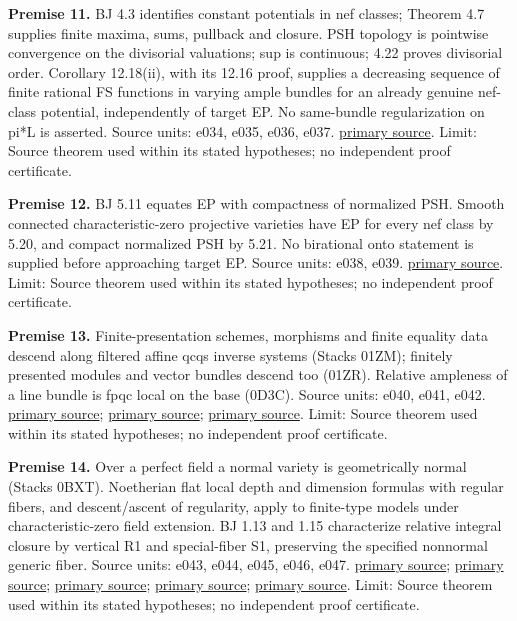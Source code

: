 \documentclass[
  10pt,
]{article}
\begin{document}
\textbf{Premise 11.} BJ 4.3 identifies constant potentials in nef
classes; Theorem 4.7 supplies finite maxima, sums, pullback and closure.
PSH topology is pointwise convergence on the divisorial valuations; sup
is continuous; 4.22 proves divisorial order. Corollary 12.18(ii), with
its 12.16 proof, supplies a decreasing sequence of finite rational FS
functions in varying ample bundles for an already genuine nef-class
potential, independently of target EP. No same-bundle regularization on
pi*L is asserted. Source units: e034, e035, e036, e037.
\href{https://arxiv.org/pdf/1801.08229v4}{primary source}. Limit: Source
theorem used within its stated hypotheses; no independent proof
certificate.

\textbf{Premise 12.} BJ 5.11 equates EP with compactness of normalized
PSH. Smooth connected characteristic-zero projective varieties have EP
for every nef class by 5.20, and compact normalized PSH by 5.21. No
birational onto statement is supplied before approaching target EP.
Source units: e038, e039.
\href{https://arxiv.org/pdf/1801.08229v4}{primary source}. Limit: Source
theorem used within its stated hypotheses; no independent proof
certificate.

\textbf{Premise 13.} Finite-presentation schemes, morphisms and finite
equality data descend along filtered affine qcqs inverse systems (Stacks
01ZM); finitely presented modules and vector bundles descend too (01ZR).
Relative ampleness of a line bundle is fpqc local on the base (0D3C).
Source units: e040, e041, e042.
\href{https://stacks.math.columbia.edu/tag/01ZM}{primary source};
\href{https://stacks.math.columbia.edu/tag/01ZR}{primary source};
\href{https://stacks.math.columbia.edu/tag/0D3C}{primary source}. Limit:
Source theorem used within its stated hypotheses; no independent proof
certificate.

\textbf{Premise 14.} Over a perfect field a normal variety is
geometrically normal (Stacks 0BXT). Noetherian flat local depth and
dimension formulas with regular fibers, and descent/ascent of
regularity, apply to finite-type models under characteristic-zero field
extension. BJ 1.13 and 1.15 characterize relative integral closure by
vertical R1 and special-fiber S1, preserving the specified nonnormal
generic fiber. Source units: e043, e044, e045, e046, e047.
\href{https://arxiv.org/pdf/1801.08229v4}{primary source};
\href{https://stacks.math.columbia.edu/tag/0BXT}{primary source};
\href{https://stacks.math.columbia.edu/tag/0337}{primary source};
\href{https://stacks.math.columbia.edu/tag/031E}{primary source};
\href{https://stacks.math.columbia.edu/tag/00OF}{primary source}. Limit:
Source theorem used within its stated hypotheses; no independent proof
certificate.
\end{document}
